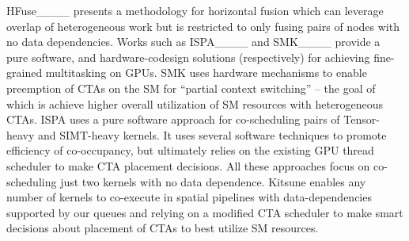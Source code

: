 HFuse____ presents a methodology for horizontal fusion which can leverage overlap of heterogeneous work but is restricted to only fusing pairs of nodes with no data dependencies. Works such as ISPA____ and SMK____ provide a pure software, and hardware-codesign solutions (respectively) for achieving fine-grained multitasking on GPUs. SMK uses hardware mechanisms to enable preemption of CTAs on the SM for ``partial context switching'' -- the goal of which is achieve higher overall utilization of SM resources with heterogeneous CTAs. ISPA uses a pure software approach for co-scheduling pairs of Tensor-heavy and SIMT-heavy kernels. It uses several software techniques to promote efficiency of co-occupancy, but ultimately relies on the existing GPU thread scheduler to make CTA placement decisions. All these approaches focus on co-scheduling just two kernels with no data dependence. Kitsune enables any number of kernels to co-execute in spatial pipelines with data-dependencies supported by our queues and relying on a modified CTA scheduler to make smart decisions about placement of CTAs to best utilize SM resources.


 

